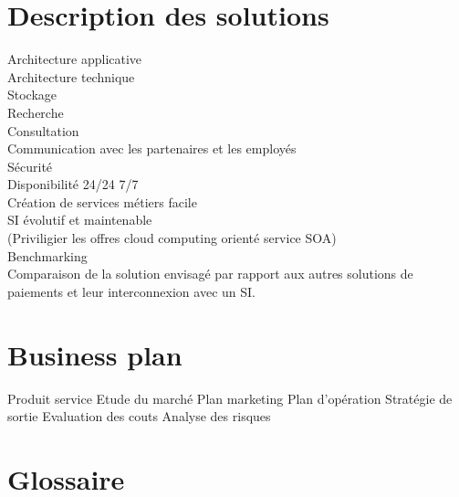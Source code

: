 \documentclass[11pt, a4paper]{article}
\begin{document}
\section{Description des solutions}
Architecture applicative
\\ Architecture technique
  \\ Stockage
  \\ Recherche
  \\ Consultation
  \\ Communication avec les partenaires et les employés
  \\ Sécurité
  \\ Disponibilité 24/24 7/7
  \\ Création de services métiers facile
  \\ SI évolutif et maintenable
  \\ (Priviligier les offres cloud computing orienté service SOA)
\\ Benchmarking
  \\ Comparaison de la solution envisagé par rapport aux autres solutions de
  \\ paiements et leur interconnexion avec un SI.

\section{Business plan}
Produit service
Etude du marché
Plan marketing
Plan d'opération
Stratégie de sortie
Evaluation des couts
Analyse des risques

\section{Glossaire}
\end{document}
